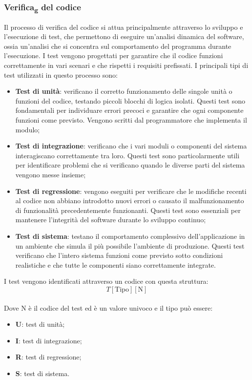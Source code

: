         \subsubsection{Verifica\textsubscript{g} del codice}
        Il processo di verifica del codice si attua principalmente attraverso lo sviluppo e l'esecuzione di test, che permettono di eseguire un'analisi dinamica del software, ossia un'analisi che si concentra sul comportamento del programma durante l'esecuzione. I test vengono progettati per garantire che il codice funzioni correttamente in vari scenari e che rispetti i requisiti prefissati. I principali tipi di test utilizzati in questo processo sono:
        \begin{itemize}
            \item \textbf{Test di unità}: verificano il corretto funzionamento delle singole unità o funzioni del codice, testando piccoli blocchi di logica isolati. Questi test sono fondamentali per individuare errori precoci e garantire che ogni componente funzioni come previsto. Vengono scritti dal programmatore che implementa il modulo;
            \item \textbf{Test di integrazione}: verificano che i vari moduli o componenti del sistema interagiscano correttamente tra loro. Questi test sono particolarmente utili per identificare problemi che si verificano quando le diverse parti del sistema vengono messe insieme;
            \item \textbf{Test di regressione}: vengono eseguiti per verificare che le modifiche recenti al codice non abbiano introdotto nuovi errori o causato il malfunzionamento di funzionalità precedentemente funzionanti. Questi test sono essenziali per mantenere l'integrità del software durante lo sviluppo continuo;
            \item \textbf{Test di sistema}: testano il comportamento complessivo dell'applicazione in un ambiente che simula il più possibile l'ambiente di produzione. Questi test verificano che l'intero sistema funzioni come previsto sotto condizioni realistiche e che tutte le componenti siano correttamente integrate.
        \end{itemize}   
        I test vengono identificati attraverso un codice con questa struttura:
        \textbf{
            \[
            T[\text{Tipo}][ \text{N}]
            \]
            }
        \\Dove N è il codice del test ed è un valore univoco e il tipo può essere:
        \begin{itemize}
            \item \textbf{U}: test di unità;
            \item \textbf{I}: test di integrazione;
            \item \textbf{R}: test di regressione;
            \item \textbf{S}: test di sistema.  
        \end{itemize}

